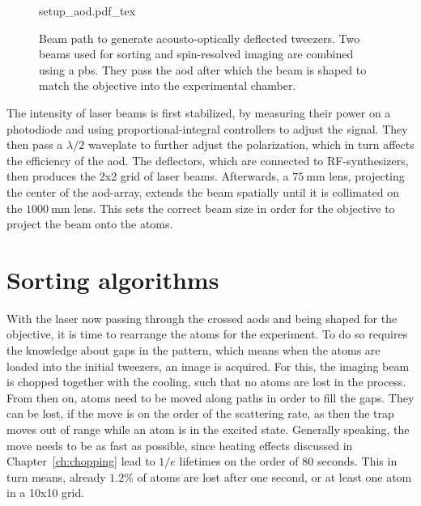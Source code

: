 \begin{figure}[t]
\label{fig:setup_aod}
\centering
	{setup_aod.pdf_tex}
	\caption{Beam path to generate acousto-optically deflected tweezers. Two beams used for sorting and spin-resolved imaging are combined using a \ac{pbs}. They pass the \ac{aod} after which the beam is shaped to match the objective into the experimental chamber.}
\end{figure}

The intensity of laser beams is first stabilized, by measuring their power on a photodiode and using proportional-integral controllers to adjust the signal. They then pass a $\lambda/2$ waveplate to further adjust the polarization, which in turn affects the efficiency of the \ac{aod}. The deflectors, which are connected to RF-synthesizers, then produces the 2x2 grid of laser beams. Afterwards, a $\SI{75}{\milli\meter}$ lens, projecting the center of the \ac{aod}-array, extends the beam spatially until it is collimated on the $\SI{1000}{\milli\meter}$ lens. This sets the correct beam size in order for the objective to project the beam onto the atoms.

\section{Sorting algorithms}

With the laser now passing through the crossed \acp{aod} and being shaped for the objective, it is time to rearrange the atoms for the experiment. To do so requires the knowledge about gaps in the pattern, which means when the atoms are loaded into the initial tweezers, an image is acquired. For this, the imaging beam is chopped together with the cooling, such that no atoms are lost in the process. From then on, atoms need to be moved along paths in order to fill the gaps. They can be lost, if the move is on the order of the scattering rate, as then the trap moves out of range while an atom is in the excited state. Generally speaking, the move needs to be as fast as possible, since heating effects discussed in Chapter~\ref{ch:chopping} lead to $1/e$ lifetimes on the order of 80 seconds. This in turn means, already $1.2\%$ of atoms are lost after one second, or at least one atom in a 10x10 grid.

